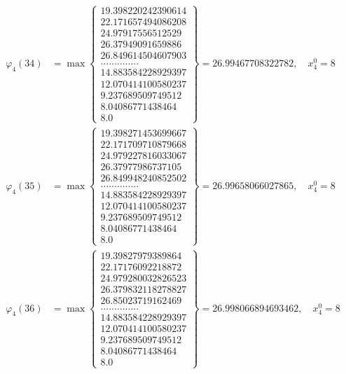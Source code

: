 \documentclass{article}
\begin{document}
\begin{align*}
  
  
  
\varphi_{4}(34) &= \max \left\{ \begin{array}{c}
19.398220242390614 \\
 22.171657494086208 \\
 24.97917556512529 \\
 26.37949091659886 \\
 26.849614504607903 \\
 .............. \\
 14.883584228929397 \\
 12.070414100580237 \\
 9.237689509749512 \\
 8.04086771438464 \\
 8.0
\end{array} \right\} = 26.99467708322782, \quad x_{4}^0 = 8\\
  
  
  
  
\varphi_{4}(35) &= \max \left\{ \begin{array}{c}
19.398271453699667 \\
 22.171709710879668 \\
 24.979227816033067 \\
 26.37977986737105 \\
 26.849948240852502 \\
 .............. \\
 14.883584228929397 \\
 12.070414100580237 \\
 9.237689509749512 \\
 8.04086771438464 \\
 8.0
\end{array} \right\} = 26.99658066027865, \quad x_{4}^0 = 8\\
  
  
  
  
\varphi_{4}(36) &= \max \left\{ \begin{array}{c}
19.39827979389864 \\
 22.17176092218872 \\
 24.979280032826523 \\
 26.379832118278827 \\
 26.85023719162469 \\
 .............. \\
 14.883584228929397 \\
 12.070414100580237 \\
 9.237689509749512 \\
 8.04086771438464 \\
 8.0
\end{array} \right\} = 26.998066894693462, \quad x_{4}^0 = 8\\
  
  
\end{align*}
\end{document}
